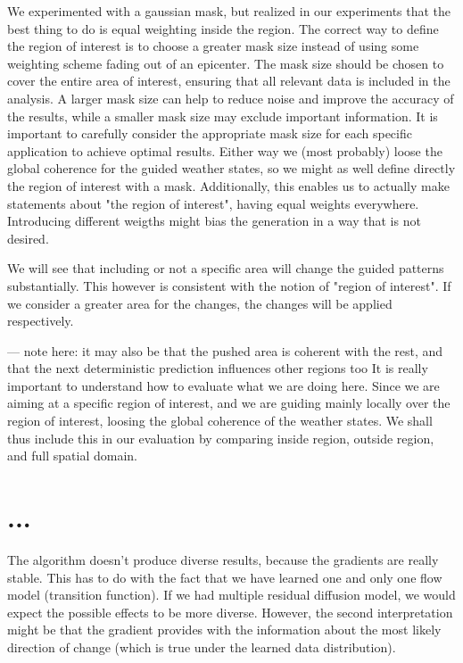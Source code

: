 We experimented with a gaussian mask, but realized in our experiments that the best thing to do is equal weighting inside the region.
The correct way to define the region of interest is to choose a greater mask size instead of using some weighting scheme fading out of an epicenter. The mask size should be chosen to cover the entire area of interest, ensuring that all relevant data is included in the analysis. A larger mask size can help to reduce noise and improve the accuracy of the results, while a smaller mask size may exclude important information. It is important to carefully consider the appropriate mask size for each specific application to achieve optimal results.
Either way we (most probably) loose the global coherence for the guided weather states, so we might as well define directly the region of interest with a mask. 
Additionally, this enables us to actually make statements about "the region of interest",
having equal weights everywhere.
Introducing different weigths might bias the generation in a way that is not desired.

We will see that including or not a specific area will change the guided patterns substantially.
This however is consistent with the notion of "region of interest".
If we consider a greater area for the changes, the changes will be applied respectively.

--- note here: it may also be that the pushed area is coherent with the rest, and that the next deterministic prediction influences other regions too
It is really important to understand how to evaluate what we are doing here.
Since we are aiming at a specific region of interest, and we are guiding mainly locally over the region of interest, loosing the global coherence of the weather states.
We shall thus include this in our evaluation by comparing inside region, outside region, and full spatial domain.

\section{...}

The algorithm doesn't produce diverse results, because the gradients are really stable.
This has to do with the fact that we have learned one and only one flow model (transition function).
If we had multiple residual diffusion model, we would expect the possible effects to be more diverse.
However, the second interpretation might be that the gradient provides with the information about the most likely direction of change (which is true under the learned data distribution).

